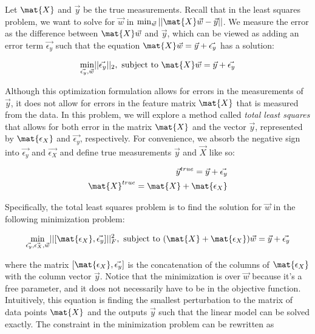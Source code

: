 \documentclass[preview]{standalone}
\begin{document}
Let $\mat{X}$ and $\vec{y}$ be the true measurements. Recall that in the least squares problem, we want to solve for $\vec{w}$ in $\min_{\vec{w}}{||\mat{X}\vec{w}-\vec{y}||}$. We measure the error as the difference between $\mat{X}\vec{w}$ and $\vec{y}$, which can be viewed as adding an error term $\vec{\epsilon_y}$ such that the equation $\mat{X}\vec{w}=\vec{y}+\vec{\epsilon_y}$ has a solution:


\begin{align}
	\min_{\vec{\epsilon_y}, \vec{w}} \lvert\lvert\vec{\epsilon_y}\rvert\rvert_2,\text{ subject to }\mat{X}\vec{w}=\vec{y}+\vec{\epsilon_y}
	\label{eq:ls_min}
\end{align}

Although this optimization formulation allows for errors in the measurements of $\vec{y}$, it does not allow for errors in the feature matrix $\mat{X}$ that is measured from the data.  In this problem, we will explore a method called \emph{total least squares} that allows for both error in the matrix $\mat{X}$ and the vector $\vec{y}$, represented by $\mat{\epsilon_X}$ and $\vec{\epsilon_y}$, respectively. For convenience, we absorb the negative sign into $\vec{\epsilon_y}$ and $\vec{\epsilon_X}$ and define true measurements $\vec{y}$ and $\vec{X}$ like so:

\begin{align}
	\vec{y}^{true} = \vec{y} + \vec{\epsilon_y} \\
	\mat{X}^{true} = \mat{X} + \mat{\epsilon_X} 
\end{align}

Specifically, the total least squares problem is to find the solution for $\vec{w}$ in the following minimization problem: 


\begin{align}
	\min_{\vec{\epsilon_y}, \vec{\epsilon_X}, \vec{w}} \lvert\lvert[\mat{\epsilon_X},\vec{\epsilon_y}]\rvert\rvert^2_F,\text{ subject to }(\mat{X}+\mat{\epsilon_X})\vec{w}=\vec{y}+\vec{\epsilon_y}
	\label{eq:tls_min}
\end{align}

where the matrix $[\mat{\epsilon_X},\vec{\epsilon_y}]$ is the concatenation of the columns of $\mat{\epsilon_X}$ with the column vector $\vec{y}$. Notice that the minimization is over $\vec{w}$ because it's a free parameter, and it does not necessarily have to be in the objective function. Intuitively, this equation is finding the smallest perturbation to the matrix of data points $\mat{X}$ and the outputs $\vec{y}$ such that the linear model can be solved exactly. The constraint in the minimization problem can be rewritten as
\end{document}
